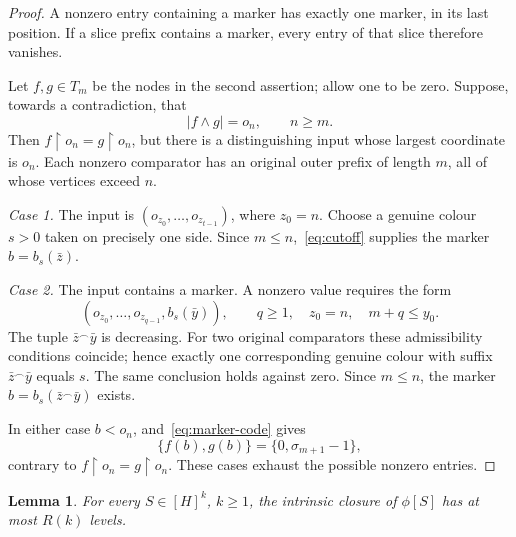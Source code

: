\documentclass{article}
\numberwithin{equation}{section}
\newtheorem{lemma}[theorem]{Lemma}
\theoremstyle{definition}
\newcommand{\res}{\mathbin{\upharpoonright}}
\newcommand{\cat}{\mathbin{{}^\frown}}
\begin{document}
\begin{proof}
A nonzero entry containing a marker has exactly one marker, in its last
position. If a slice prefix contains a marker, every entry of that slice
therefore vanishes.

Let $f,g\in T_m$ be the nodes in the second assertion; allow one to be
zero. Suppose, towards a contradiction, that
\[
 |f\wedge g|=o_n,\qquad n\geq m.
\]
Then $f\res o_n=g\res o_n$, but there is a distinguishing input whose
largest coordinate is $o_n$. Each nonzero comparator has an original outer
prefix of length $m$, all of whose vertices exceed $n$.

\emph{Case 1.} The input is $(o_{z_0},\ldots,o_{z_{t-1}})$, where $z_0=n$.
Choose a genuine colour $s>0$ taken on precisely one side. Since
$m\leq n$,~\eqref{eq:cutoff} supplies the marker $b=b_s(\bar z)$.

\emph{Case 2.} The input contains a marker. A nonzero value requires the form
\[
 (o_{z_0},\ldots,o_{z_{q-1}},b_s(\bar y)),\qquad
 q\geq1,\quad z_0=n,\quad m+q\leq y_0.
\]
The tuple $\bar z\cat\bar y$ is decreasing. For two original comparators
these admissibility conditions coincide; hence exactly one corresponding
genuine colour with suffix $\bar z\cat\bar y$ equals $s$. The same conclusion
holds against zero. Since $m\leq n$, the marker
$b=b_s(\bar z\cat\bar y)$ exists.

In either case $b<o_n$, and~\eqref{eq:marker-code} gives
\[
 \{f(b),g(b)\}=\{0,\sigma_{m+1}-1\},
\]
contrary to $f\res o_n=g\res o_n$.
These cases exhaust the possible nonzero entries.
\end{proof}

\begin{lemma}\label{lem:bound}
For every $S\in[H]^k$, $k\geq1$, the intrinsic closure of $\phi[S]$ has
at most $R(k)$ levels.
\end{lemma}
\end{document}

